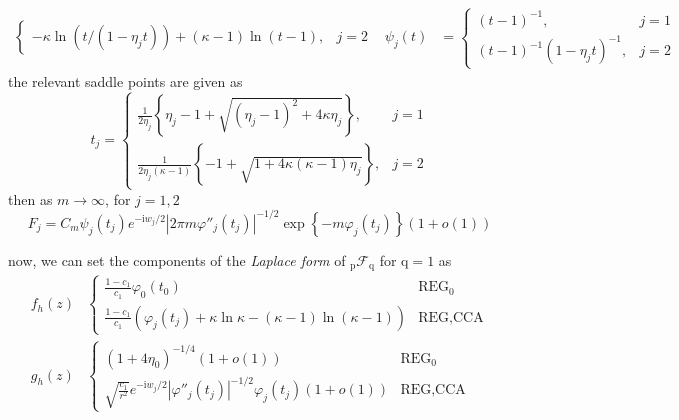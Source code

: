 \documentclass[twoside]{article}
\begin{document}
\begin{itemize}
\begin{itemize}
\begin{itemize}
\begin{align*}
\begin{cases}
                    -\kappa \ln(t/(1-\eta_jt))+(\kappa-1)\ln(t-1), &j=2
                \end{cases} & \psi_j(t) &=\begin{cases}
                    (t-1)^{-1},&j=1\\
                    (t-1)^{-1}(1-\eta_jt)^{-1}, &j=2
                \end{cases}
            \end{align*}
            the relevant saddle points are given as
            \begin{equation*}
                t_j = \begin{cases}
                    \frac{1}{2\eta_j}\left\{ \eta_j-1 + \sqrt{(\eta_j-1)^2+4\kappa\eta_j} \right\}, &j=1\\
                    \frac{1}{2\eta_j(\kappa-1)}\left\{ -1 + \sqrt{1+4\kappa(\kappa-1)\eta_j} \right\}, &j=2
                \end{cases}
            \end{equation*}
            then as $m\rightarrow \infty$, for $j=1,2$
            $$
            F_j = C_m \psi_j(t_j)e^{-\mathrm{i}w_j/2}\left\vert 2\pi m\varphi''_j(t_j) \right\vert^{-1/2}\exp\left\{-m\varphi_j(t_j)\right\} (1+o(1))
            $$
        \end{itemize}
        now, we can set the components of the \textit{Laplace form} of $_{\mathrm{p}}\mathcal{F}_{\mathrm{q}}$ for $\mathrm{q}=1$ as
        \begin{align}
            f_{h}(z) & \begin{cases}
                \frac{1-c_1}{c_1}\varphi_0(t_0) & \text{REG}_0\\
                \frac{1-c_1}{c_1}\left(\varphi_j(t_j)+\kappa\ln\kappa - (\kappa-1)\ln(\kappa-1)\right) & \text{REG,CCA}
            \end{cases}\\
            g_h(z) & \begin{cases}
                (1+4\eta_0)^{-1/4}(1+o(1)) & \text{REG}_0\\
                \sqrt{\frac{c_1}{r^2}}e^{-\mathrm{i}w_j/2}\left\vert \varphi''_{j}(t_j) \right\vert^{-1/2} \varphi_j(t_j)(1+o(1)) & \text{REG,CCA}
            \end{cases}
        \end{align}
    \end{itemize}
\end{itemize}
\end{document}
